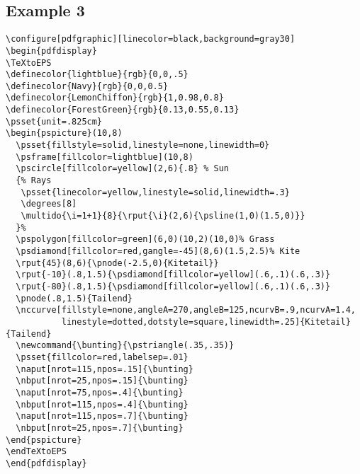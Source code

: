 \documentclass{ltxguide}
\begin{document}
\subsection{Example 3}
\begin{verbatim}
\configure[pdfgraphic][linecolor=black,background=gray30]
\begin{pdfdisplay}
\TeXtoEPS
\definecolor{lightblue}{rgb}{0,0,.5}
\definecolor{Navy}{rgb}{0,0,0.5}
\definecolor{LemonChiffon}{rgb}{1,0.98,0.8}
\definecolor{ForestGreen}{rgb}{0.13,0.55,0.13}
\psset{unit=.825cm}
\begin{pspicture}(10,8)
  \psset{fillstyle=solid,linestyle=none,linewidth=0}
  \psframe[fillcolor=lightblue](10,8)
  \pscircle[fillcolor=yellow](2,6){.8} % Sun
  {% Rays
   \psset{linecolor=yellow,linestyle=solid,linewidth=.3}
   \degrees[8]
   \multido{\i=1+1}{8}{\rput{\i}(2,6){\psline(1,0)(1.5,0)}}
  }%
  \pspolygon[fillcolor=green](6,0)(10,2)(10,0)% Grass
  \psdiamond[fillcolor=red,gangle=-45](8,6)(1.5,2.5)% Kite
  \rput{45}(8,6){\pnode(-2.5,0){Kitetail}}
  \rput{-10}(.8,1.5){\psdiamond[fillcolor=yellow](.6,.1)(.6,.3)}
  \rput{-80}(.8,1.5){\psdiamond[fillcolor=yellow](.6,.1)(.6,.3)}
  \pnode(.8,1.5){Tailend}
  \nccurve[fillstyle=none,angleA=270,angleB=125,ncurvB=.9,ncurvA=1.4,
           linestyle=dotted,dotstyle=square,linewidth=.25]{Kitetail}{Tailend}
  \newcommand{\bunting}{\pstriangle(.35,.35)}
  \psset{fillcolor=red,labelsep=.01}
  \naput[nrot=115,npos=.15]{\bunting}
  \nbput[nrot=25,npos=.15]{\bunting}
  \naput[nrot=75,npos=.4]{\bunting}
  \nbput[nrot=115,npos=.4]{\bunting}
  \naput[nrot=115,npos=.7]{\bunting}
  \nbput[nrot=25,npos=.7]{\bunting}
\end{pspicture}
\endTeXtoEPS
\end{pdfdisplay}
\end{verbatim}
\end{document}
